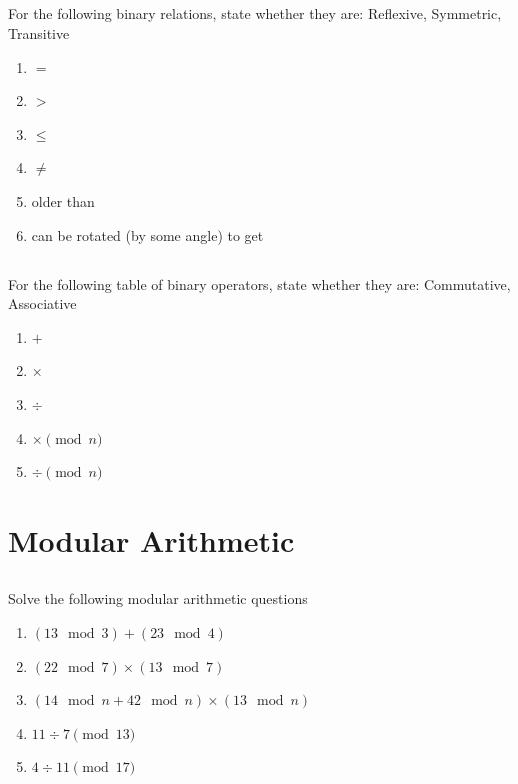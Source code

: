\documentclass[twocolumn]{article}
\begin{document}
\subsection{}

    For the following binary relations, state whether they are: Reflexive, Symmetric, Transitive

    \begin{enumerate}
        \item $=$
        \item $ > $
        \item $ \leq $
        \item $ \ne $
        \item older than
        \item can be rotated (by some angle) to get
    \end{enumerate}

\subsection{}

    For the following table of binary operators, state whether they are: Commutative, Associative

    \begin{enumerate}
        \item $ + $
        \item $ \times $
        \item $ \div $
        \item $ \times \pmod{n} $
        \item $ \div \pmod{n} $
    \end{enumerate}   


\clearpage
\section{Modular Arithmetic}

\subsection{}

    Solve the following modular arithmetic questions

    \begin{enumerate}
        \item $(13 \mod 3) + (23 \mod 4)$
        \item $(22 \mod 7) \times (13 \mod 7)$
        \item $(14 \mod n + 42 \mod n) \times (13 \mod n)$
        \item $11 \div 7 \pmod{13}$
        \item $4 \div 11 \pmod{17}$
    \end{enumerate}
\end{document}
